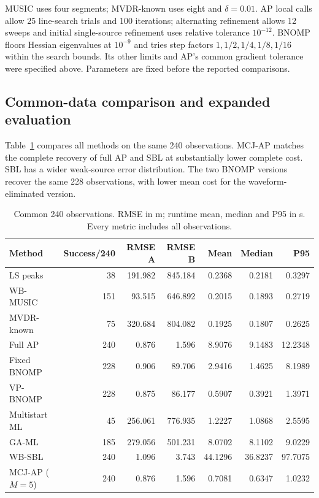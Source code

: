 \documentclass[a4paper,fleqn,review]{cas-sc}
\begin{document}
MUSIC uses four segments; MVDR-known uses eight and $\delta=0.01$. AP local calls allow 25 line-search trials and 100 iterations; alternating refinement allows 12 sweeps and initial single-source refinement uses relative tolerance $10^{-12}$. BNOMP floors Hessian eigenvalues at $10^{-9}$ and tries step factors $1,1/2,1/4,1/8,1/16$ within the search bounds. Its other limits and AP's common gradient tolerance were specified above. Parameters are fixed before the reported comparisons.

\FloatBarrier
\subsection{Common-data comparison and expanded evaluation}
Table~\ref{en:common} compares all methods on the same 240 observations. MCJ-AP matches the complete recovery of full AP and SBL at substantially lower complete cost. SBL has a wider weak-source error distribution. The two BNOMP versions recover the same 228 observations, with lower mean cost for the waveform-eliminated version.
\begin{table}[pos=H]\centering\small
\caption{Common 240 observations. RMSE in m; runtime mean, median and P95 in s. Every metric includes all observations.}\label{en:common}
\begin{tabular}{@{}lrrrrrr@{}}\toprule
Method & Success/240 & RMSE A & RMSE B & Mean & Median & P95\\\midrule
LS peaks & 38 & 191.982 & 845.184 & 0.2368 & 0.2181 & 0.3297\\
WB-MUSIC & 151 & 93.515 & 646.892 & 0.2015 & 0.1893 & 0.2719\\
MVDR-known & 75 & 320.684 & 804.082 & 0.1925 & 0.1807 & 0.2625\\
Full AP & 240 & 0.876 & 1.596 & 8.9076 & 9.1483 & 12.2348\\
Fixed BNOMP & 228 & 0.906 & 89.706 & 2.9416 & 1.4625 & 8.1989\\
VP-BNOMP & 228 & 0.875 & 86.177 & 0.5907 & 0.3921 & 1.3971\\
Multistart ML & 45 & 256.061 & 776.935 & 1.2227 & 1.0868 & 2.5595\\
GA-ML & 185 & 279.056 & 501.231 & 8.0702 & 8.1102 & 9.0229\\
WB-SBL & 240 & 1.096 & 3.743 & 44.1296 & 36.8237 & 97.7075\\
MCJ-AP ($M=5$) & 240 & 0.876 & 1.596 & 0.7081 & 0.6347 & 1.0232\\\bottomrule
\end{tabular}\end{table}
\end{document}
